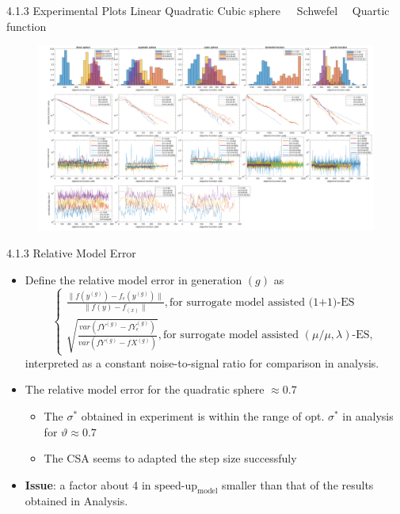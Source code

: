 \documentclass{beamer}
\begin{document}
\begin{frame}{4.1.3 Experimental Plots }
\qquad Linear \qquad Quadratic \qquad Cubic sphere\ \ \ Schwefel \ \  Quartic function
\begin{figure}
\includegraphics[width=1.0\linewidth]{merged_plot_NO_emergency_v4_final.pdf}
\end{figure}
\end{frame}

\begin{frame}{4.1.3 Relative Model Error  }
\begin{itemize}
    \item Define the relative model error in generation $(g)$ as
    $$\begin{cases}\frac{\|f(y^{(g)})-f_{\epsilon}(y^{(g)}) \|}{\|f(y)-f_(x) \|},\text{for surrogate model assisted (1+1)-ES} \\ \sqrt{\frac{ var(fY^{(g)}-fY_{\epsilon}^{(g)})}{var(fY^{(g)}-fX^{(g)})}},\text{for surrogate model assisted }(\mu/\mu,\lambda)\text{-ES},\end{cases}$$
    interpreted as a constant noise-to-signal ratio for comparison in analysis.
    \item The relative model error for the quadratic sphere $\approx 0.7$
        \begin{itemize}
            \item The $\sigma^*$ obtained in experiment is within the range of opt. $\sigma^*$ in analysis for $\vartheta \approx 0.7$
            \item The CSA seems to adapted the step size successfuly
        \end{itemize}
    \item \textbf{Issue}: a factor about 4 in $\text{speed-up}_{\text{model}}$ smaller than that of the results obtained in Analysis.
    
\end{itemize}
\end{frame}
\end{document}
